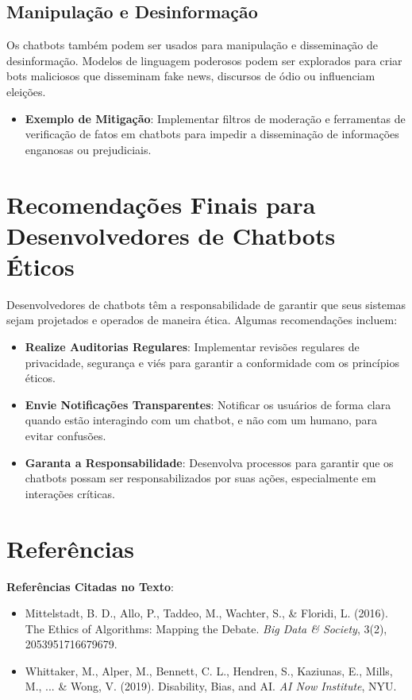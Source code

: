 \documentclass[14pt,a4paper,oneside]{book}
\begin{document}
\subsection{Manipulação e Desinformação}

Os chatbots também podem ser usados para manipulação e disseminação de desinformação. Modelos de linguagem poderosos podem ser explorados para criar bots maliciosos que disseminam fake news, discursos de ódio ou influenciam eleições.

\begin{itemize}
	\item \textbf{Exemplo de Mitigação}: Implementar filtros de moderação e ferramentas de verificação de fatos em chatbots para impedir a disseminação de informações enganosas ou prejudiciais.
\end{itemize}

\section{Recomendações Finais para Desenvolvedores de Chatbots Éticos}

Desenvolvedores de chatbots têm a responsabilidade de garantir que seus sistemas sejam projetados e operados de maneira ética. Algumas recomendações incluem:

\begin{itemize}
	\item \textbf{Realize Auditorias Regulares}: Implementar revisões regulares de privacidade, segurança e viés para garantir a conformidade com os princípios éticos.
	\item \textbf{Envie Notificações Transparentes}: Notificar os usuários de forma clara quando estão interagindo com um chatbot, e não com um humano, para evitar confusões.
	\item \textbf{Garanta a Responsabilidade}: Desenvolva processos para garantir que os chatbots possam ser responsabilizados por suas ações, especialmente em interações críticas.
\end{itemize}

\section{Referências}

\textbf{Referências Citadas no Texto}:

\begin{itemize}
	\item Mittelstadt, B. D., Allo, P., Taddeo, M., Wachter, S., \& Floridi, L. (2016). The Ethics of Algorithms: Mapping the Debate. \textit{Big Data \& Society}, 3(2), 2053951716679679.
	\item Whittaker, M., Alper, M., Bennett, C. L., Hendren, S., Kaziunas, E., Mills, M., ... \& Wong, V. (2019). Disability, Bias, and AI. \textit{AI Now Institute}, NYU.
\end{itemize}
\end{document}

